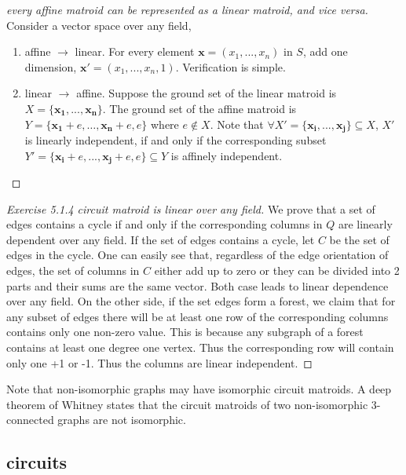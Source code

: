 \documentclass[12pt]{article}
\begin{document}
\begin{proof}[every affine matroid can be represented as a linear matroid, and vice versa]
    $ $\newline
    Consider a vector space over any field,
    \begin{enumerate}
        \item affine $\to$ linear. For every element $\mathbf{x}=(x_1,...,x_n)$ in $S$, add one dimension, $\mathbf{x'}=(x_1,...,x_n,1)$. Verification is simple.
        \item linear $\to$ affine. Suppose the ground set of the linear matroid is $X=\{\mathbf{x_1},...,\mathbf{x_n}\}$. The ground set of the affine matroid is $Y=\{\mathbf{x_1}+e,\dots,\mathbf{x_n}+e,e\}$ where $e\notin X$. Note that $\forall X'=\{\mathbf{x_i},...,\mathbf{x_j}\}\subseteq X$, $X'$ is linearly independent, if and only if the corresponding subset $Y'=\{\mathbf{x_i}+e,...,\mathbf{x_j}+e,e\}\subseteq Y$ is affinely independent.
    \end{enumerate}
\end{proof}
\begin{proof}[Exercise 5.1.4 circuit matroid is linear over any field]
    We prove that a set of edges contains a cycle if and only if the corresponding columns in $Q$ are linearly dependent over any field. If the set of edges contains a cycle, let $C$ be the set of edges in the cycle. One can easily see that, regardless of the edge orientation of edges, the set of columns in $C$ either add up to zero or they can be divided into 2 parts and their sums are the same vector. Both case leads to linear dependence over any field. On the other side, if the set edges form a forest, we claim that for any subset of edges there will be at least one row of the corresponding columns contains only one non-zero value. This is because any subgraph of a forest contains at least one degree one vertex. Thus the corresponding row will contain only one +1 or -1. Thus the columns are linear independent. 

\end{proof}

Note that non-isomorphic graphs may have isomorphic circuit matroids. A deep theorem of
Whitney states that the circuit matroids of two non-isomorphic 3-connected graphs
are not isomorphic.

\subsection{circuits}
\end{document}
